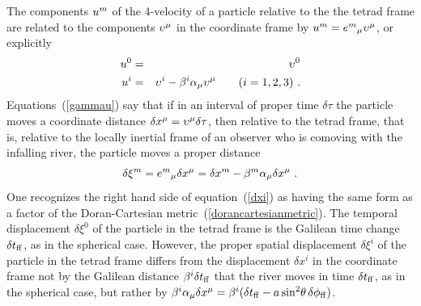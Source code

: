 \documentclass[twocolumn,showpacs,preprintnumbers,amsmath,amssymb,prb]{revtex4}
\begin{document}

The components $u^m$ of the 4-velocity of a particle
relative to the the tetrad frame
are related to the components $\upsilon^\mu$ in the coordinate frame by
$u^m = {e^m}_\mu \upsilon^\mu$,
or explicitly
\begin{eqnarray}
\label{gammau}
  u^0
  &=&
  \upsilon^0
\nonumber
\\
  u^i
  &=&
  \upsilon^i - \beta^i \alpha_\mu \upsilon^\mu
  \qquad
  (i=1,2,3)
  \ .
\end{eqnarray}
Equations~(\ref{gammau}) say that
if in an interval of proper time $\delta \tau$ the particle moves
a coordinate distance $\delta x^\mu = \upsilon^\mu \delta \tau$,
then relative to the tetrad frame,
that is,
relative to the locally inertial frame of an observer who is comoving with the
infalling river,
the particle moves
a proper distance
\begin{equation}
\label{dxi}
  \delta \xi^m
  = {e^m}_\mu \delta x^\mu
  = \delta x^m - \beta^m \alpha_\mu \delta x^\mu
  \ .
\end{equation}
One recognizes the right hand side of equation~(\ref{dxi})
as having the same form as a factor of the Doran-Cartesian
metric~(\ref{dorancartesianmetric}).
The temporal displacement $\delta \xi^0$ of the particle in the tetrad frame
is the Galilean time change $\delta t_{\rm ff}$,
as in the spherical case.
However,
the proper spatial displacement $\delta \xi^i$
of the particle in the tetrad frame
differs from the displacement $\delta x^i$ in the coordinate frame
not by the Galilean distance $\beta^i \delta t_{\rm ff}$
that the river moves in time $\delta t_{\rm ff}$,
as in the spherical case,
but rather by
$\beta^i \alpha_\mu \delta x^\mu
= \beta^i (\delta t_{\rm ff} - a \sin^2\!\theta \, \delta \phi_{\rm ff})$.
\end{document}
